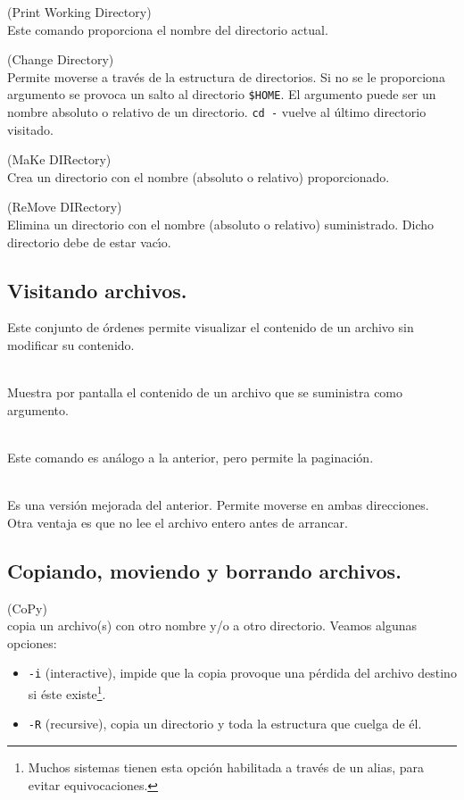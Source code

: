 \noindent  
{} (Print Working Directory) \\[1mm]
Este comando proporciona el nombre del directorio actual.

\noindent 
{} (Change Directory) \\
Permite moverse a trav{\'e}s de la estructura de directorios. Si no se le
proporciona argumento se provoca un salto al directorio \verb+$HOME+.
El argumento puede ser un nombre absoluto o relativo de un directorio.
\verb+cd -+ vuelve al \'ultimo directorio visitado.

\noindent 
{} (MaKe DIRectory)\\
Crea un directorio con el nombre (absoluto o relativo) proporcionado.

\noindent 
{} (ReMove DIRectory)\\
Elimina un directorio con el nombre (absoluto o relativo)
suministrado. Dicho directorio debe de estar vac{\'\i}o.

\subsection{Visitando archivos.}

Este conjunto de {\'o}rdenes permite visualizar el contenido de un archivo
sin modificar su contenido.

\noindent
{}\\
Muestra por pantalla el contenido de un archivo que se suministra como
argumento.

\noindent
{}\\
Este comando es an{\'a}logo a la anterior, pero permite la paginaci{\'o}n.

\noindent
{}\\
Es una versi{\'o}n mejorada del anterior. Permite moverse en ambas
direcciones. Otra ventaja es que no lee el archivo entero antes de
arrancar.

\subsection{Copiando, moviendo y borrando archivos.}

\noindent
{} (CoPy)\\
copia un archivo(s) con otro nombre y/o a otro directorio. Veamos
algunas opciones:

\begin{itemize}
  
\item {\verb+-i+} (interactive), impide que la copia provoque una
  p{\'e}rdida del archivo destino si {\'e}ste existe\footnote{Muchos sistemas
    tienen esta opci{\'o}n habilitada a trav{\'e}s de un alias, para evitar
    equivocaciones.}.
  
\item {\verb+-R+} (recursive), copia un directorio y toda la
  estructura que cuelga de {\'e}l.

\end{itemize}



